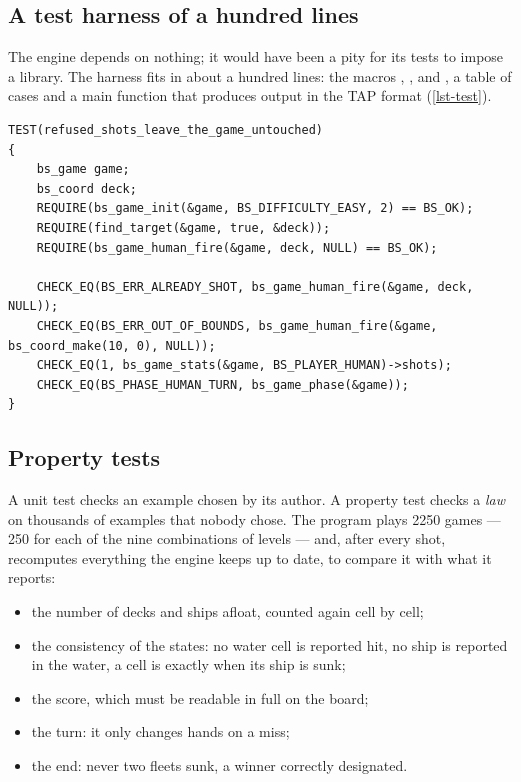 \subsection{A test harness of a hundred lines}

The engine depends on nothing; it would have been a pity for its tests to impose a library.
The harness  fits in about a hundred lines: the macros ,
,  and , a table of cases and a main function that
produces output in the TAP format (\cref{lst-test}).

\begin{lstlisting}[basicstyle=\ttfamily\footnotesize,
                   caption={A unit test: a refused shot modifies nothing (requirement~C4).},
                   label={lst-test}]
TEST(refused_shots_leave_the_game_untouched)
{
    bs_game game;
    bs_coord deck;
    REQUIRE(bs_game_init(&game, BS_DIFFICULTY_EASY, 2) == BS_OK);
    REQUIRE(find_target(&game, true, &deck));
    REQUIRE(bs_game_human_fire(&game, deck, NULL) == BS_OK);

    CHECK_EQ(BS_ERR_ALREADY_SHOT, bs_game_human_fire(&game, deck, NULL));
    CHECK_EQ(BS_ERR_OUT_OF_BOUNDS, bs_game_human_fire(&game, bs_coord_make(10, 0), NULL));
    CHECK_EQ(1, bs_game_stats(&game, BS_PLAYER_HUMAN)->shots);
    CHECK_EQ(BS_PHASE_HUMAN_TURN, bs_game_phase(&game));
}
\end{lstlisting}

\subsection{Property tests}
\label{sec-proprietes}

A unit test checks an example chosen by its author. A property test checks a \emph{law} on
thousands of examples that nobody chose. The program  plays
\num{2250} games --- 250 for each of the nine combinations of levels --- and, after every
shot, recomputes everything the engine keeps up to date, to compare it with what it reports:

\begin{itemize}
    \item the number of decks and ships afloat, counted again cell by cell;
    \item the consistency of the states: no water cell is reported hit, no ship is reported
          in the water, a cell is  exactly when its ship is sunk;
    \item the score, which must be readable in full on the board;
    \item the turn: it only changes hands on a miss;
    \item the end: never two fleets sunk, a winner correctly designated.
\end{itemize}


